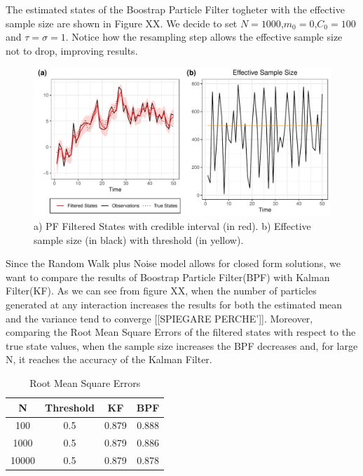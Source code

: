 \documentclass[
]{book}
\theoremstyle{break}
\theoremstyle{nonumberplain}
\begin{document}
The estimated states of the Boostrap Particle Filter togheter with the
effective sample size are shown in Figure XX. We decide to set
\(N=1000\),\(m_{0}=0\),\(C_{0}=100\) and \(\tau=\sigma=1\). Notice how
the resampling step allows the effective sample size not to drop,
improving results.

\begin{figure}[H]

{\centering \includegraphics{final-draft_files/figure-latex/unnamed-chunk-14-1} 

}

\caption{a) PF Filtered States with credible interval (in red). b) Effective sample size (in black) with threshold (in yellow).}\label{fig:unnamed-chunk-14}
\end{figure}

Since the Random Walk plus Noise model allows for closed form solutions,
we want to compare the results of Boostrap Particle Filter(BPF) with
Kalman Filter(KF). As we can see from figure XX, when the number of
particles generated at any interaction increases the results for both
the estimated mean and the variance tend to converge {[}{[}SPIEGARE
PERCHE'{]}{]}. Moreover, comparing the Root Mean Square Errors of the
filtered states with respect to the true state values, when the sample
size increases the BPF decreases and, for large N, it reaches the
accuracy of the Kalman Filter.

\begin{longtable}[t]{cccc}
\caption{\label{tab:unnamed-chunk-16}Root Mean Square Errors}\\
\toprule
N & Threshold & KF & BPF\\
\midrule
100 & 0.5 & 0.879 & 0.888\\
1000 & 0.5 & 0.879 & 0.886\\
10000 & 0.5 & 0.879 & 0.878\\
\bottomrule
\end{longtable}
\end{document}
